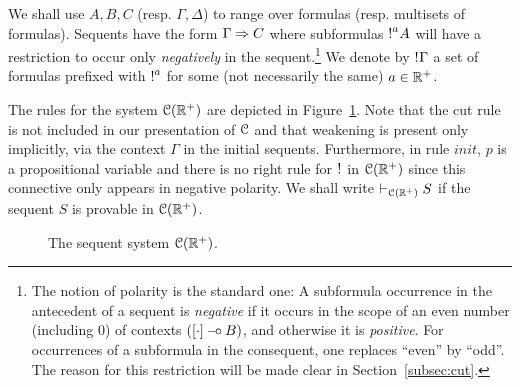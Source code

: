 We shall use $A,B,C$ (resp. $\Gamma,\Delta$) to range over formulas (resp. multisets of formulas).  
Sequents have the form $\Gamma\Rightarrow C$ where subformulas $\hbox{$\mathop{!}^{a}$}A$ will have a restriction to occur only {\em negatively} in the sequent.\footnote{The notion of polarity  is the standard one: A subformula occurrence in the antecedent of a sequent is {\em negative} if it occurs in the scope of an even number (including $0$) of contexts $([\cdot]\mathbin{-\hspace{-0.70mm}\circ} B)$, and otherwise it is {\em positive}. For occurrences of a subformula in the consequent, one replaces ``even'' by ``odd''. The reason for this restriction will be made clear in Section~\ref{subsec:cut}.}
%
We denote by $\hbox{$\mathop{!}^{}$}\Gamma$ a set of formulas  prefixed with $\hbox{$\mathop{!}^{a}$}$ for some (not necessarily the same) $a\in\mathbb{R}^+$. 

The rules for the system $\mathcal{C}(\mathbb{R}^+)$ are depicted in Figure~\ref{fig:ll}. Note that the cut rule is not included in our presentation of $\mathcal{C}$ and that weakening is present only implicitly, via the context $\Gamma$ in the initial sequents. Furthermore, in rule $init$, $p$ is a propositional variable and there is no right rule for $\hbox{$\mathop{!}^{}$}$ in $\mathcal{C}(\mathbb{R}^+)$ since this connective only appears in negative polarity.
We shall write $\vdash_{\mathcal{C}(\mathbb{R}^+)} S$ if the sequent $S$ is provable in $\mathcal{C}(\mathbb{R}^+)$.

\begin{figure}[t]
\caption{The sequent system $\mathcal{C}(\mathbb{R}^+)$.}
\label{fig:ll}
\end{figure}

